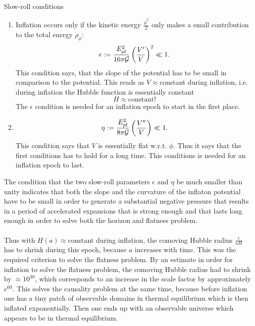\begin{mybox}{Slow-roll conditions}
\begin{enumerate}
	\item Inflation occurs only if the kinetic energy $\frac{\dot{\phi}^2}{2}$ only makes a small contribution to the total energy $\rho_\phi$:
	\begin{equation}
\epsilon := \frac{E^2_{pl}}{16 \pi \mathcal{G}} \left( \frac{V^\prime}{V}\right)^2 \ll 1.
	\end{equation}
	This condition says, that the slope of the potential has to be small in comparison to the potential. This reads as $V\approx$constant during inflation, i.e. during inflation the Hubble function is essentially constant
	\begin{equation}
		H\approx \text{constant} !
	\end{equation}
	The $\epsilon$ condition is needed for an inflation epoch to start in the first place.
	\item 
	\begin{equation}
		\eta := \frac{E^2_{pl}}{8 \pi \mathcal{G}} \left(\frac{V^{\prime \prime} }{V}\right) \ll 1.
	\end{equation}
	This condition says that $V$ is essentially flat w.r.t. $\phi$. Thus it says that the first conditions has to hold for a long time. This conditions is needed for an inflation epoch to last.
\end{enumerate}
\end{mybox}
The condition that the two slow-roll parameters $\epsilon$ and $\eta$ be much smaller than unity indicates that both the slope and the curvature of the inflaton potential have to be small in order to generate a substantial negative pressure that results in a period of accelerated expansions that is strong enough and that lasts long enough in order to solve both the horizon and flatness problem.\\
\\
Thus with $H(a)\approx$constant during inflation, the comoving Hubble radius $\frac{c}{aH}$ has to shrink during this epoch, because $a$ increases with time. This was the required criterion to solve the flatness problem. By an estimate in order for inflation to solve the flatness problem, the comoving Hubble radius had to shrink by $\approx 10^30$, which corresponds to an increase in the scale factor by approximately $e^{60}$. This solves the causality problem at the same time, because before inflation one has a tiny patch of observable domains in thermal equilibrium which is then inflated exponentially. Then one ends up with an observable universe which appears to be in thermal equilibrium.\\
